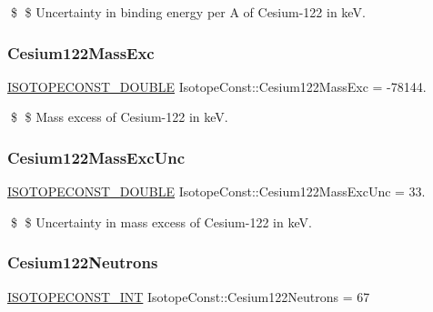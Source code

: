 \$ \$ Uncertainty in binding energy per A of Cesium-\/122 in keV. \mbox{\label{group___isotope_const-_cesium-_cs122_ga7ec151e287e6fefd6c2970604e6424a3}} 
\subsubsection{\texorpdfstring{Cesium122\+Mass\+Exc}{Cesium122MassExc}}
{\footnotesize\ttfamily \mbox{\hyperlink{group___isotope_const-_macros_ga8f45a7272ce02c0b4c65c44636ed719a}{I\+S\+O\+T\+O\+P\+E\+C\+O\+N\+S\+T\+\_\+\+D\+O\+U\+B\+LE}} Isotope\+Const\+::\+Cesium122\+Mass\+Exc = -\/78144.}

\$ \$ Mass excess of Cesium-\/122 in keV. \mbox{\label{group___isotope_const-_cesium-_cs122_gaef46fcd6e9eab4fc7eb68646de25d675}} 
\subsubsection{\texorpdfstring{Cesium122\+Mass\+Exc\+Unc}{Cesium122MassExcUnc}}
{\footnotesize\ttfamily \mbox{\hyperlink{group___isotope_const-_macros_ga8f45a7272ce02c0b4c65c44636ed719a}{I\+S\+O\+T\+O\+P\+E\+C\+O\+N\+S\+T\+\_\+\+D\+O\+U\+B\+LE}} Isotope\+Const\+::\+Cesium122\+Mass\+Exc\+Unc = 33.}

\$ \$ Uncertainty in mass excess of Cesium-\/122 in keV. \mbox{\label{group___isotope_const-_cesium-_cs122_ga1a94692414f541522dfc1bc0f874b256}} 
\subsubsection{\texorpdfstring{Cesium122\+Neutrons}{Cesium122Neutrons}}
{\footnotesize\ttfamily \mbox{\hyperlink{group___isotope_const-_macros_ga5f18360b3e99483a35c32d789e62621c}{I\+S\+O\+T\+O\+P\+E\+C\+O\+N\+S\+T\+\_\+\+I\+NT}} Isotope\+Const\+::\+Cesium122\+Neutrons = 67}

